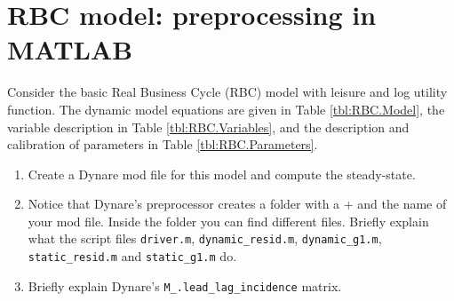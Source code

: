 \section[RBC model: preprocessing in MATLAB]{RBC model: preprocessing in MATLAB\label{ex:PreprocessMATLABRBC}}
Consider the basic Real Business Cycle (RBC) model with leisure and log utility function.
The dynamic model equations are given in Table \ref{tbl:RBC.Model},
  the variable description in Table \ref{tbl:RBC.Variables},
  and the description and calibration of parameters in Table \ref{tbl:RBC.Parameters}.

{\footnotesize

}%
\begin{enumerate}

\item Create a Dynare mod file for this model and compute the steady-state.

\item Notice that Dynare's preprocessor creates a folder with a + and the name of your mod file.
Inside the folder you can find different files.
Briefly explain what the script files \texttt{driver.m}, \texttt{dynamic\_resid.m}, \texttt{dynamic\_g1.m}, \texttt{static\_resid.m} and \texttt{static\_g1.m} do.

\item Briefly explain Dynare's \texttt{M\_.lead\_lag\_incidence} matrix.


\end{enumerate}
